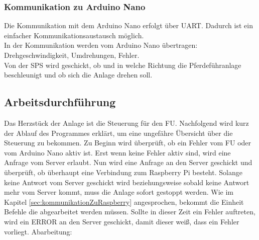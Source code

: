 \subsubsection{Kommunikation zu Arduino Nano}
\label{sec:kommunikationnZuArduinoNano}

Die Kommunikation mit dem Arduino Nano erfolgt über \ac{UART}. Dadurch ist ein einfacher Kommunikationsaustausch möglich.\\
In der Kommunikation werden vom Arduino Nano übertragen: Drehgeschwindigkeit, Umdrehungen, Fehler.\\
Von der SPS wird geschickt, ob und in welche Richtung die Pferdeführanlage beschleunigt und ob sich die Anlage drehen soll.

\subsection{Arbeitsdurchführung}
\label{sec:arbeitsdurchführung}

Das Herzstück der Anlage ist die Steuerung für den \acl{FU}. Nachfolgend wird kurz der Ablauf des Programmes erklärt, um eine ungefähre Übersicht über die Steuerung zu bekommen. \newline{}
Zu Beginn wird überprüft, ob ein Fehler vom \ac{FU} oder vom Arduino Nano aktiv ist. Erst wenn keine Fehler aktiv sind, wird eine Anfrage vom Server erlaubt. Nun wird eine Anfrage an den Server geschickt und überprüft, ob überhaupt eine Verbindung zum Raspberry Pi besteht. Solange keine Antwort vom Server geschickt wird beziehungsweise sobald keine Antwort mehr vom Server kommt, muss die Anlage sofort gestoppt werden. Wie im Kapitel \ref{sec:kommunikationZuRaspberry} angesprochen, bekommt die Einheit Befehle die abgearbeitet werden müssen. Sollte in dieser Zeit ein Fehler auftreten, wird  ein ERROR an den Server geschickt, damit dieser weiß, dass ein Fehler vorliegt. \newline{}
Abarbeitung:

